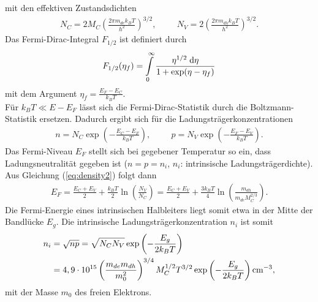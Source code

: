 mit den effektiven Zustandsdichten
\begin{align}
N_C=2M_C\left(\frac{2\pi m_{de}k_B T}{h^2}\right)^{3/2},\hspace{1cm}N_V=2\left(\frac{2\pi m_{dh}k_B T}{h^2}\right)^{3/2}.
\end{align}
Das Fermi-Dirac-Integral $F_{1/2}$ ist definiert durch
\begin{align}
F_{1/2}(\eta_f)=\int\limits_0^\infty \frac{\eta^{1/2}\;\mathrm{d} \eta}{1+\exp(\eta-\eta_f)}
\end{align}
mit dem Argument $\eta_f=\frac{E_F-E_C}{k_B T}$.\\
Für $k_B T\ll E-E_F$ lässt sich die Fermi-Dirac-Statistik durch die Boltzmann-Statistik ersetzen. Dadurch ergibt sich für die Ladungsträgerkonzentrationen
\begin{align}
n=N_C\exp\left(-\frac{E_C-E_F}{k_B T}\right),\hspace{1cm} p=N_V\exp\left(-\frac{E_F-E_V}{k_B T}\right).
\label{eq:density2}
\end{align}
Das Fermi-Niveau $E_F$ stellt sich bei gegebener Temperatur so ein, dass Ladungsneutralität gegeben ist ($n=p=n_i$, $n_i$: intrinsische Ladungsträgerdichte).\\
Aus Gleichung (\ref{eq:density2}) folgt dann
\begin{align}
E_F=\frac{E_C+E_V}{2}+\frac{k_B T}{2}\ln\left(\frac{N_V}{N_C}\right)=\frac{E_C+E_V}{2}+\frac{3 k_B T}{4}\ln\left(\frac{m_{dh}}{m_{de}M_C^{2/3}}\right).
\end{align}
Die Fermi-Energie eines intrinsischen Halbleiters liegt somit etwa in der Mitte der Bandlücke $E_g$. Die intrinsische Ladungsträgerkonzentration $n_i$ ist somit
\begin{align}
n_i&=\sqrt{np}=\sqrt{N_C N_V}\exp\left(-\frac{E_g}{2k_B T}\right)\notag\\
&=4,9\cdot 10^{15}\left(\frac{m_{de}m_{dh}}{m_0^2}\right)^{3/4}M_C^{1/2}T^{3/2}\exp\left(-\frac{E_g}{2k_B T}\right)\mathrm{cm}^{-3},
\label{eq:p_intrinsic}
\end{align} 
mit der Masse $m_0$ des freien Elektrons.
